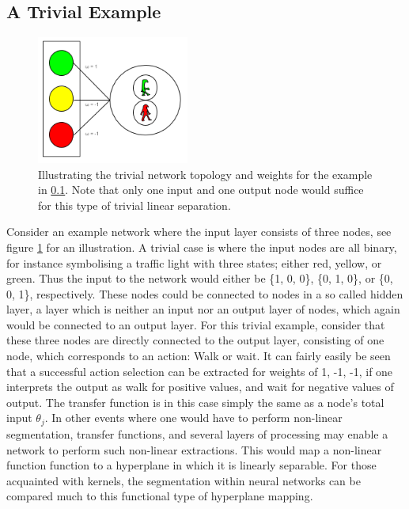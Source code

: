\subsection{A Trivial Example}\label{trivial_example}

\begin{figure}
\centering
\includegraphics[width=5cm]{fig/trivial_example}
\caption{Illustrating the trivial network topology and weights for the example in \ref{trivial_example}. Note that only one input and one output node would suffice for this type of trivial linear separation.}
\label{fig:trivial_example}
\end{figure}

Consider an example network where the input layer consists of three nodes, see figure \ref{fig:trivial_example} for an illustration. A trivial case is where the input nodes are all binary, for instance symbolising a traffic light with three states; either red, yellow, or green. Thus the input to the network would either be \{1, 0, 0\}, \{0, 1, 0\}, or \{0, 0, 1\}, respectively. These nodes could be connected to nodes in a so called hidden layer, a layer which is neither an input nor an output layer of nodes, which again would be connected to an output layer. For this trivial example, consider that these three nodes are directly connected to the output layer, consisting of one node, which corresponds to an action: Walk or wait. It can fairly easily be seen that a successful action selection can be extracted for weights of {1, -1, -1}, if one interprets the output as walk for positive values, and wait for negative values of output. The transfer function is in this case simply the same as a node's total input $\theta_j$. 
In other events where one would have to perform non-linear segmentation, transfer functions, and several layers of processing may enable a network to perform such non-linear extractions. This would map a non-linear function function to a hyperplane in which it is linearly separable. For those acquainted with kernels, the segmentation within neural networks can be compared much to this functional type of hyperplane mapping.


